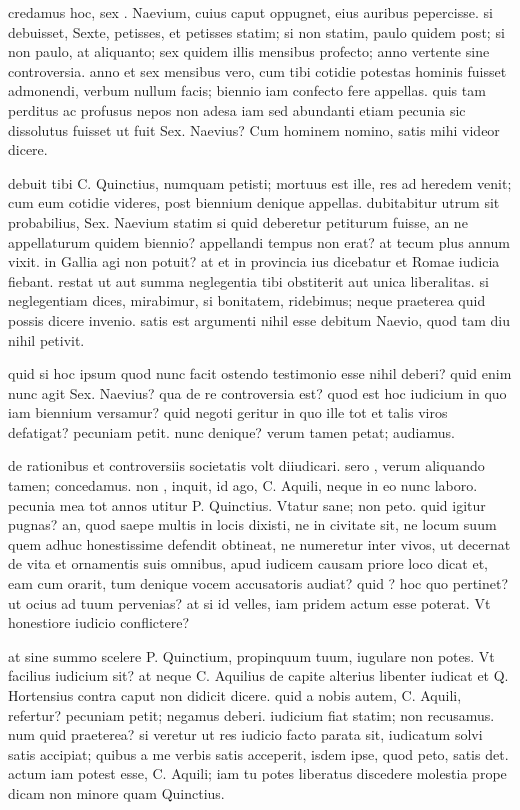  credamus hoc, sex . Naevium, cuius caput oppugnet, eius auribus pepercisse. si debuisset, Sexte, petisses, et petisses statim; si non statim, paulo quidem post; si non paulo, at aliquanto; sex quidem illis mensibus profecto; anno vertente sine controversia. anno et sex mensibus vero, cum tibi cotidie potestas hominis fuisset admonendi, verbum nullum facis; biennio iam confecto fere appellas. quis tam perditus ac profusus nepos non adesa iam sed abundanti etiam pecunia sic dissolutus fuisset ut fuit Sex. Naevius? Cum hominem nomino, satis mihi videor dicere.

 debuit tibi C. Quinctius, numquam petisti; mortuus est ille, res ad heredem venit; cum eum cotidie videres, post biennium denique appellas. dubitabitur utrum sit probabilius, Sex. Naevium statim si quid deberetur petiturum fuisse, an ne appellaturum quidem biennio? appellandi tempus non erat? at tecum plus annum vixit. in Gallia agi non potuit? at et in provincia ius dicebatur et Romae iudicia fiebant. restat ut aut summa neglegentia tibi obstiterit aut unica liberalitas. si neglegentiam dices, mirabimur, si bonitatem, ridebimus; neque praeterea quid possis dicere invenio. satis est argumenti nihil esse debitum Naevio, quod tam diu nihil petivit.

 quid si hoc ipsum quod nunc facit ostendo testimonio esse nihil deberi? quid enim nunc agit Sex. Naevius? qua de re controversia est? quod est hoc iudicium in quo iam biennium versamur? quid negoti geritur in quo ille tot et talis viros defatigat? pecuniam petit. nunc denique? verum tamen petat; audiamus.

 de rationibus et controversiis societatis volt diiudicari. sero , verum aliquando tamen; concedamus. non , inquit, id ago, C. Aquili, neque in eo nunc laboro. pecunia mea tot annos utitur P. Quinctius. Vtatur sane; non peto. quid igitur pugnas? an, quod saepe multis in locis dixisti, ne in civitate sit, ne locum suum quem adhuc honestissime defendit obtineat, ne numeretur inter vivos, ut decernat de vita et ornamentis suis omnibus, apud iudicem causam priore loco dicat et, eam cum orarit, tum denique vocem accusatoris audiat? quid ? hoc quo pertinet? ut ocius ad tuum pervenias? at si id velles, iam pridem actum esse poterat. Vt honestiore iudicio conflictere?

 at sine summo scelere P. Quinctium, propinquum tuum, iugulare non potes. Vt facilius iudicium sit? at neque C. Aquilius de capite alterius libenter iudicat et Q. Hortensius contra caput non didicit dicere. quid a nobis autem, C. Aquili, refertur? pecuniam petit; negamus deberi. iudicium fiat statim; non recusamus. num quid praeterea? si veretur ut res iudicio facto parata sit, iudicatum solvi satis accipiat; quibus a me verbis satis acceperit, isdem ipse, quod peto, satis det. actum iam potest esse, C. Aquili; iam tu potes liberatus discedere molestia prope dicam non minore quam Quinctius.

